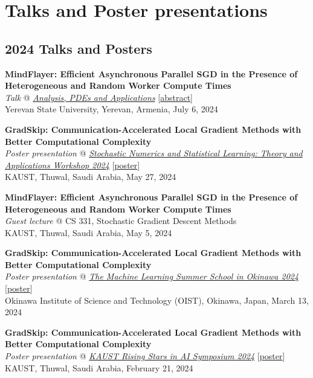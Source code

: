 \documentclass[11pt,a4paper,sans]{moderncv}        %
\begin{document}
\section{Talks and Poster presentations}
\vspace{4pt}

\subsection{2024 Talks and Posters}
\begin{etaremune}
\item \textbf{MindFlayer: Efficient Asynchronous Parallel SGD in the Presence of Heterogeneous and Random Worker Compute Times} \\
\textit{Talk} @ \textcolor{accent}{\href{https://gmg70.com/}{\textit{Analysis, PDEs and Applications}}} [\href{https://gmg70.com/downloads/ConferenceAbstracts.pdf#page=19}{abstract}]\\
Yerevan State University, Yerevan, Armenia, July 6, 2024

\item \textbf{GradSkip: Communication-Accelerated Local Gradient Methods with Better Computational Complexity}\\
\textit{Poster presentation} @ \textcolor{accent}{\href{https://cemse.kaust.edu.sa/events/event/snsl-workshop-2024}{\textit{Stochastic Numerics and Statistical Learning: Theory and Applications Workshop 2024}}} [\href{https://artomaranjyan.github.io/assets/pdf/GradSkip_Rising_Stars.pdf}{poster}]\\
KAUST, Thuwal, Saudi Arabia, May 27, 2024

\item \textbf{MindFlayer: Efficient Asynchronous Parallel SGD in the Presence of Heterogeneous and Random Worker Compute Times}\\
\textit{Guest lecture} @ CS 331, Stochastic Gradient Descent Methods \\
KAUST, Thuwal, Saudi Arabia, May 5, 2024

\item \textbf{GradSkip: Communication-Accelerated Local Gradient Methods with Better Computational Complexity}\\
\textit{Poster presentation} @ \textcolor{accent}{\href{https://groups.oist.jp/mlss}{\textit{The Machine Learning Summer School in Okinawa 2024
}}} [\href{https://artomaranjyan.github.io/assets/pdf/GradSkip_MLSS_Okinawa.pdf}{poster}] \\
Okinawa Institute of Science and Technology (OIST), Okinawa, Japan, March 13, 2024

\item \textbf{GradSkip: Communication-Accelerated Local Gradient Methods with Better Computational Complexity}\\
\textit{Poster presentation} @ \textcolor{accent}{\href{https://cemse.kaust.edu.sa/ai/aii-symp-2024}{\textit{KAUST Rising Stars in AI Symposium 2024}}} [\href{https://artomaranjyan.github.io/assets/pdf/GradSkip_Rising_Stars.pdf}{poster}]\\
KAUST, Thuwal, Saudi Arabia, February 21, 2024
\end{etaremune}
\end{document}
